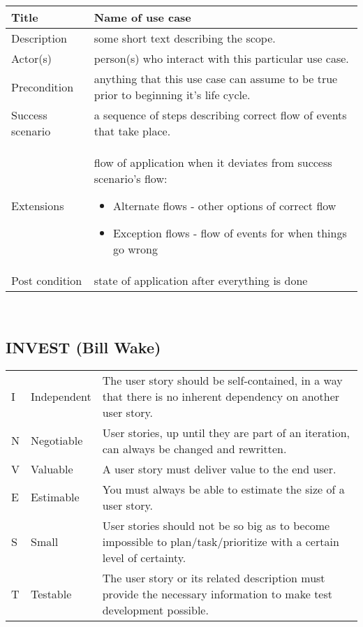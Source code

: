 \begin{minipage}[t]{0.5\linewidth}
\ifslides
\else
\begin{tabularx}{\linewidth}{lX}
  \toprule %
  Title & Name of use case \\
  \midrule
    Description & some short text describing the scope.\\
  \midrule
    Actor(s) & person(s) who interact with this particular use case. \\
  \midrule
    Precondition & anything that this use case can assume to be true
                        prior to beginning it's life cycle.\\
  \midrule
    Success scenario & a sequence of steps describing correct flow of
         events that take place.\\
  \midrule
  Extensions & flow of application when it deviates from success scenario's flow:
    \begin{itemize}
    \item
      Alternate flows - other options of correct flow
    \item
      Exception flows - flow of events for when things go wrong
    \end{itemize}\\
  \midrule
        Post condition &  state of application after everything is done\\
        \bottomrule
\end{tabularx}\\[2ex]
\fi

%
\subsection{INVEST (Bill Wake)}
\begin{tabularx}{\linewidth}{l|l|X}
  I & Independent &The user story should be self-contained, in a way that there is no inherent dependency on another user story. \\
  N & Negotiable & User stories, up until they are part of an iteration, can always be changed and rewritten.\\
  V & Valuable & A user story must deliver value to the end user.\\
  E & Estimable & You must always be able to estimate the size of a user story.\\
  S & Small & User stories should not be so big as to become impossible to plan/task/prioritize with a certain level of certainty.\\
  T & Testable & The user story or its related description must provide the necessary information to make test development possible.\\
\end{tabularx}
\newpage

\end{minipage}
